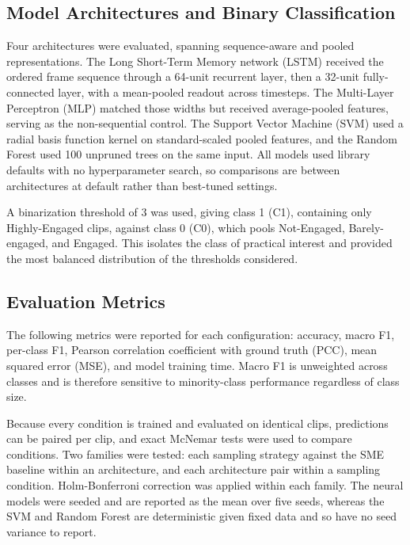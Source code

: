 \documentclass[11pt,a4paper]{article}
\begin{document}
\subsection{Model Architectures and Binary Classification}

Four architectures were evaluated, spanning sequence-aware and pooled representations. The Long Short-Term Memory network (LSTM) received the ordered frame sequence through a 64-unit recurrent layer, then a 32-unit fully-connected layer, with a mean-pooled readout across timesteps. The Multi-Layer Perceptron (MLP) matched those widths but received average-pooled features, serving as the non-sequential control. The Support Vector Machine (SVM) used a radial basis function kernel on standard-scaled pooled features, and the Random Forest used 100 unpruned trees on the same input. All models used library defaults with no hyperparameter search, so comparisons are between architectures at default rather than best-tuned settings.

A binarization threshold of 3 was used, giving class 1 (C1), containing only Highly-Engaged clips, against class 0 (C0), which pools Not-Engaged, Barely-engaged, and Engaged. This isolates the class of practical interest and provided the most balanced distribution of the thresholds considered.

\subsection{Evaluation Metrics}

The following metrics were reported for each configuration: accuracy, macro F1, per-class F1, Pearson correlation coefficient with ground truth (PCC), mean squared error (MSE), and model training time. Macro F1 is unweighted across classes and is therefore sensitive to minority-class performance regardless of class size.

Because every condition is trained and evaluated on identical clips, predictions can be paired per clip, and exact McNemar tests were used to compare conditions. Two families were tested: each sampling strategy against the SME baseline within an architecture, and each architecture pair within a sampling condition. Holm-Bonferroni correction was applied within each family. The neural models were seeded and are reported as the mean over five seeds, whereas the SVM and Random Forest are deterministic given fixed data and so have no seed variance to report.

\end{document}
